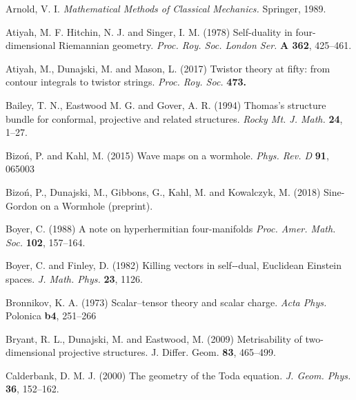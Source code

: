 
\begin{thebibliography}{}

Arnold, V. I.
\textit{Mathematical Methods of Classical Mechanics.} Springer, 1989.

Atiyah, M. F.  Hitchin, N. J. and  Singer, I. M. (1978) 
Self-duality in four-dimensional Riemannian geometry. \textit{Proc. Roy. Soc. London Ser.} {\bf A 362},  425--461.

Atiyah, M., Dunajski, M. and Mason, L. (2017)
Twistor theory at fifty: from contour integrals to twistor strings. \textit{Proc. Roy. Soc.} {\bf 473.}


 Bailey, T. N., Eastwood M. G. and Gover, A. R. (1994)
Thomas's structure bundle for conformal, projective
  and related structures. {\em Rocky Mt. J.
    Math.} {\bf 24}, 1--27.
  


 Bizo\'n, P. and Kahl, M. (2015)
Wave maps on a wormhole. \textit{Phys. Rev. D} {\bf 91}, 065003

 Bizo\'n, P., Dunajski, M., Gibbons, G., Kahl, M. and Kowalczyk, M. (2018) Sine-Gordon on a Wormhole (preprint).


 Boyer, C. (1988)
A note on hyperhermitian four-manifolds \textit{Proc. Amer. Math. Soc.} {\bf 102},
157--164.

 Boyer, C. and Finley, D. (1982)
Killing vectors in self‐-dual, Euclidean Einstein spaces. \textit{J. Math. Phys.} {\bf 23}, 1126.

 Bronnikov, K. A. (1973)
Scalar--tensor theory and scalar charge. \textit{Acta Phys.} Polonica {\bf b4}, 251--266


 Bryant, R. L., Dunajski, M. and Eastwood, M. (2009)
Metrisability of two-dimensional projective structures.
J. Differ. Geom. {\bf 83}, 465--499.


 Calderbank, D. M. J. (2000) The geometry of the Toda 
equation. \textit{J. Geom. Phys.} {\bf 36},  152--162.



\end{thebibliography}
